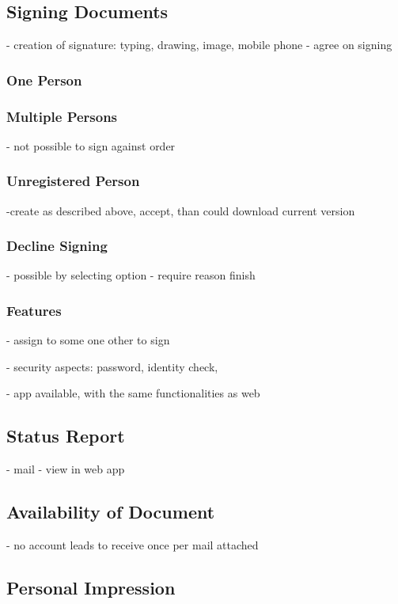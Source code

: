 \subsection{Signing Documents}

- creation of signature: typing, drawing, image, mobile phone
- agree on signing

\subsubsection{One Person}

\subsubsection{Multiple Persons}
- not possible to sign against order

\subsubsection{Unregistered Person}
-create as described above, accept, than could download current version

\subsubsection{Decline Signing}
- possible by selecting option
- require reason finish

\subsubsection{Features}
- assign to some one other to sign

- security aspects: password, identity check, 

- app available, with the same functionalities as web

\subsection{Status Report}
- mail 
- view in web app

\subsection{Availability of Document}
- no account leads to receive once per mail attached

\subsection{Personal Impression}
